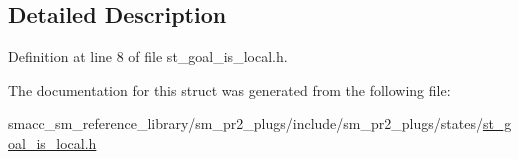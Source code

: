 \subsection{Detailed Description}


Definition at line 8 of file st\+\_\+goal\+\_\+is\+\_\+local.\+h.



The documentation for this struct was generated from the following file\+:\begin{DoxyCompactItemize}
\item 
smacc\+\_\+sm\+\_\+reference\+\_\+library/sm\+\_\+pr2\+\_\+plugs/include/sm\+\_\+pr2\+\_\+plugs/states/\hyperlink{st__goal__is__local_8h}{st\+\_\+goal\+\_\+is\+\_\+local.\+h}\end{DoxyCompactItemize}
